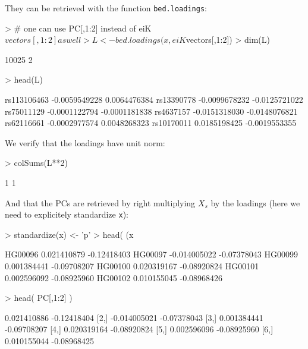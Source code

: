 \documentclass{article}
\renewenvironment{Schunk}{\vspace{\topsep}}{\vspace{\topsep}}
\begin{document}
  They can be retrieved with the function \verb!bed.loadings!:
\begin{Schunk}
\begin{Sinput}
> # one can use PC[,1:2] instead of eiK$vectors[,1:2] as well
> L <- bed.loadings(x, eiK$vectors[,1:2])
> dim(L)
\end{Sinput}
\begin{Soutput}
[1] 10025     2
\end{Soutput}
\begin{Sinput}
> head(L)
\end{Sinput}
\begin{Soutput}
                     [,1]          [,2]
rs113106463 -0.0059549228  0.0064476384
rs13390778  -0.0099678232 -0.0125721022
rs75011129  -0.0001122794 -0.0001181838
rs4637157   -0.0151318030 -0.0148076821
rs62116661  -0.0002977574  0.0048268323
rs10170011   0.0185198425 -0.0019553355
\end{Soutput}
\end{Schunk}

We verify that the loadings have unit norm:
\begin{Schunk}
\begin{Sinput}
> colSums(L**2)
\end{Sinput}
\begin{Soutput}
[1] 1 1
\end{Soutput}
\end{Schunk}

And that the PCs are retrieved by right multiplying $X_s$ by the loadings (here we need 
to explicitely standardize \verb!x!):
\begin{Schunk}
\begin{Sinput}
> standardize(x) <- 'p'
> head( (x %
\end{Sinput}
\begin{Soutput}
                [,1]        [,2]
HG00096  0.021410879 -0.12418403
HG00097 -0.014005022 -0.07378043
HG00099  0.001384441 -0.09708207
HG00100  0.020319167 -0.08920824
HG00101  0.002596092 -0.08925960
HG00102  0.010155045 -0.08968426
\end{Soutput}
\begin{Sinput}
> head( PC[,1:2] )
\end{Sinput}
\begin{Soutput}
             [,1]        [,2]
[1,]  0.021410886 -0.12418404
[2,] -0.014005021 -0.07378043
[3,]  0.001384441 -0.09708207
[4,]  0.020319164 -0.08920824
[5,]  0.002596096 -0.08925960
[6,]  0.010155044 -0.08968425
\end{Soutput}
\end{Schunk}
\end{document}

